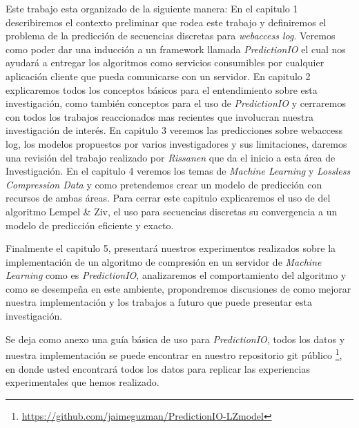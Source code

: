 
Este trabajo esta organizado de la siguiente manera: En el capitulo 1 describiremos el contexto preliminar que rodea este trabajo y definiremos el problema de la predicción de secuencias discretas para \emph{webaccess log}. Veremos como poder dar una inducción a un framework llamada \emph{PredictionIO} el cual nos ayudará a entregar los algoritmos como servicios consumibles por cualquier aplicación cliente que pueda comunicarse con un servidor.
En capitulo 2 explicaremos todos los conceptos básicos para el entendimiento sobre esta investigación, como también conceptos para el uso de \emph{PredictionIO} y cerraremos con todos los trabajos  reaccionados mas recientes que involucran nuestra investigación de interés. En capitulo 3 veremos las predicciones sobre webaccess log, los modelos propuestos por varios investigadores y sus limitaciones, daremos una revisión del trabajo realizado por \emph{Rissanen}\cite{Rissanen1984} que da el inicio a esta área de Investigación.
En el capitulo 4 veremos los temas de \emph{Machine Learning} y \emph{Lossless Compression Data} y como pretendemos crear un modelo de predicción con recursos de ambas áreas. Para cerrar este capitulo explicaremos el uso de del algoritmo Lempel \& Ziv, el uso para secuencias discretas su convergencia a un modelo de predicción eficiente y exacto. 

Finalmente el capitulo 5, presentará nuestros experimentos realizados sobre la implementación de un algoritmo de compresión en un servidor de \emph{Machine Learning} como es \emph{PredictionIO}, analizaremos el comportamiento del algoritmo y como se desempeña en este ambiente, propondremos discusiones de como mejorar nuestra implementación y los trabajos a futuro que puede presentar esta investigación.

Se deja como anexo una guía básica de uso para \emph{PredictionIO}, todos los datos y nuestra implementación se puede encontrar en nuestro repositorio git público \footnote{\url{https://github.com/jaimeguzman/PredictionIO-LZmodel}}, en donde usted encontrará todos los datos para replicar las experiencias experimentales que hemos realizado. 
